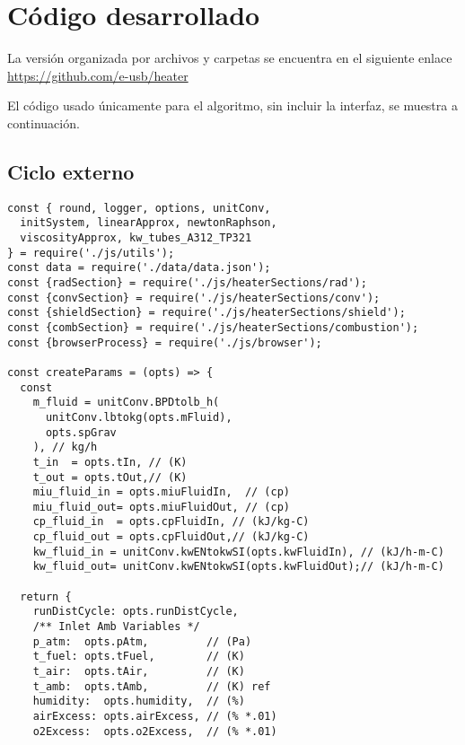 \chapter{Código desarrollado}

\par La versión organizada por archivos y carpetas se encuentra en el siguiente enlace \url{https://github.com/e-usb/heater}

\par El código usado únicamente para el algoritmo, sin incluir la interfaz, se muestra a continuación.

\section{Ciclo externo}

\begin{verbatim}
const { round, logger, options, unitConv, 
  initSystem, linearApprox, newtonRaphson, 
  viscosityApprox, kw_tubes_A312_TP321
} = require('./js/utils');
const data = require('./data/data.json');
const {radSection} = require('./js/heaterSections/rad');
const {convSection} = require('./js/heaterSections/conv');
const {shieldSection} = require('./js/heaterSections/shield');
const {combSection} = require('./js/heaterSections/combustion');
const {browserProcess} = require('./js/browser');

const createParams = (opts) => {
  const
    m_fluid = unitConv.BPDtolb_h(
      unitConv.lbtokg(opts.mFluid),
      opts.spGrav
    ), // kg/h
    t_in  = opts.tIn, // (K)
    t_out = opts.tOut,// (K)
    miu_fluid_in = opts.miuFluidIn,  // (cp)
    miu_fluid_out= opts.miuFluidOut, // (cp)
    cp_fluid_in  = opts.cpFluidIn, // (kJ/kg-C)
    cp_fluid_out = opts.cpFluidOut,// (kJ/kg-C) 
    kw_fluid_in = unitConv.kwENtokwSI(opts.kwFluidIn), // (kJ/h-m-C)
    kw_fluid_out= unitConv.kwENtokwSI(opts.kwFluidOut);// (kJ/h-m-C)

  return {
    runDistCycle: opts.runDistCycle,
    /** Inlet Amb Variables */
    p_atm:  opts.pAtm,         // (Pa) 
    t_fuel: opts.tFuel,        // (K) 
    t_air:  opts.tAir,         // (K)
    t_amb:  opts.tAmb,         // (K) ref
    humidity:  opts.humidity,  // (%) 
    airExcess: opts.airExcess, // (% *.01) 
    o2Excess:  opts.o2Excess,  // (% *.01) 
    

\end{verbatim}
